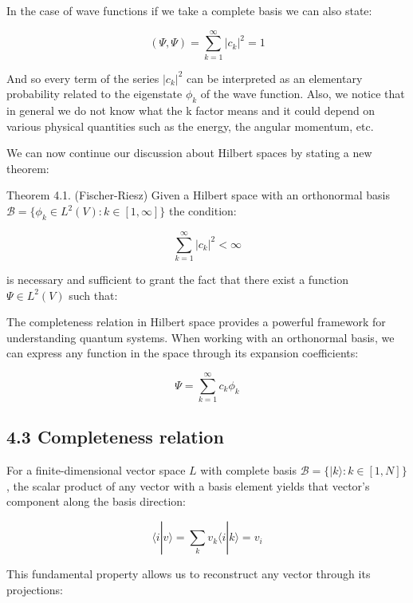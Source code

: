 \documentclass[10pt]{article}
\begin{document}
In the case of wave functions if we take a complete basis we can also state:

\begin{equation*}
(\Psi, \Psi) = \sum_{k=1}^{\infty}|c_k|^2 = 1 \tag{4.21}
\end{equation*}

And so every term of the series $|c_k|^2$ can be interpreted as an elementary probability related to the eigenstate $\phi_k$ of the wave function. Also, we notice that in general we do not know what the k factor means and it could depend on various physical quantities such as the energy, the angular momentum, etc.

We can now continue our discussion about Hilbert spaces by stating a new theorem:

Theorem 4.1. (Fischer-Riesz) Given a Hilbert space with an orthonormal basis $\mathcal{B} = \{\phi_k \in L^2(V): k \in [1,\infty]\}$ the condition:

\begin{equation*}
\sum_{k=1}^{\infty}|c_k|^2 < \infty \tag{4.22}
\end{equation*}

is necessary and sufficient to grant the fact that there exist a function $\Psi \in L^2(V)$ such that:


The completeness relation in Hilbert space provides a powerful framework for understanding quantum systems. When working with an orthonormal basis, we can express any function in the space through its expansion coefficients:

\begin{equation*}
\Psi = \sum_{k=1}^{\infty} c_k\phi_k \tag{4.23}
\end{equation*}

\subsection*{4.3 Completeness relation}

For a finite-dimensional vector space $L$ with complete basis $\mathcal{B} = \{|k\rangle: k \in [1,N]\}$, the scalar product of any vector with a basis element yields that vector's component along the basis direction:

\begin{equation*}
\langle i|v\rangle = \sum_k v_k\langle i|k\rangle = v_i \tag{4.24}
\end{equation*}

This fundamental property allows us to reconstruct any vector through its projections:
\end{document}
